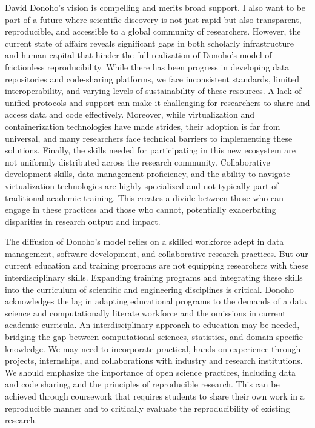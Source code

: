 \documentclass[]{hdsr}
\begin{document}
David Donoho's vision is compelling and merits broad support. I also want to be part of a future where scientific discovery is not just rapid but also transparent, reproducible, and accessible to a global community of researchers. However, the current state of affairs reveals significant gaps in both scholarly infrastructure and human capital that hinder the full realization of Donoho's model of frictionless reproducibility. While there has been progress in developing data repositories and code-sharing platforms, we face inconsistent standards, limited interoperability, and varying levels of sustainability of these resources. A lack of unified protocols and support can make it challenging for researchers to share and access data and code effectively. Moreover, while virtualization and containerization technologies have made strides, their adoption is far from universal, and many researchers face technical barriers to implementing these solutions. Finally, the skills needed for participating in this new ecosystem are not uniformly distributed across the research community. Collaborative development skills, data management proficiency, and the ability to navigate virtualization technologies are highly specialized and not typically part of traditional academic training. This creates a divide between those who can engage in these practices and those who cannot, potentially exacerbating disparities in research output and impact.

The diffusion of Donoho's model relies on a skilled workforce adept in data management, software development, and collaborative research practices. But our current education and training programs are not equipping researchers with these interdisciplinary skills. Expanding training programs and integrating these skills into the curriculum of scientific and engineering disciplines is critical.
Donoho acknowledges the lag in adapting educational programs to the demands of a data science and computationally literate workforce and the omissions in current academic curricula. An interdisciplinary approach to education may be needed, bridging the gap between computational sciences, statistics, and domain-specific knowledge. We may need to incorporate practical, hands-on experience through projects, internships, and collaborations with industry and research institutions. We should emphasize the importance of open science practices, including data and code sharing, and the principles of reproducible research. This can be achieved through coursework that requires students to share their own work in a reproducible manner and to critically evaluate the reproducibility of existing research.
\end{document}
